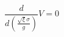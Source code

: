 \begin{equation}  \label{dudal4}
\frac{d}{d\left(\frac{\sqrt{\xi}\sigma}{g}\right) }V=0
\end{equation}

